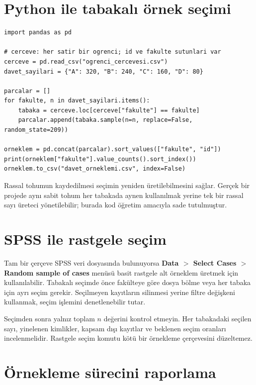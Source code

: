 \section{Python ile tabakalı örnek seçimi}

\begin{lstlisting}
import pandas as pd

# cerceve: her satir bir ogrenci; id ve fakulte sutunlari var
cerceve = pd.read_csv("ogrenci_cercevesi.csv")
davet_sayilari = {"A": 320, "B": 240, "C": 160, "D": 80}

parcalar = []
for fakulte, n in davet_sayilari.items():
    tabaka = cerceve.loc[cerceve["fakulte"] == fakulte]
    parcalar.append(tabaka.sample(n=n, replace=False, random_state=209))

orneklem = pd.concat(parcalar).sort_values(["fakulte", "id"])
print(orneklem["fakulte"].value_counts().sort_index())
orneklem.to_csv("davet_orneklemi.csv", index=False)
\end{lstlisting}

Rassal tohumun kaydedilmesi seçimin yeniden üretilebilmesini sağlar. Gerçek
bir projede aynı sabit tohum her tabakada aynen kullanılmak yerine tek bir
rassal sayı üreteci yönetilebilir; burada kod öğretim amacıyla sade
tutulmuştur.

\section{SPSS ile rastgele seçim}

Tam bir çerçeve SPSS veri dosyasında bulunuyorsa \textbf{Data $>$ Select Cases
$>$ Random sample of cases} menüsü basit rastgele alt örneklem üretmek için
kullanılabilir. Tabakalı seçimde önce fakülteye göre dosya bölme veya her
tabaka için ayrı seçim gerekir. Seçilmeyen kayıtların silinmesi yerine filtre
değişkeni kullanmak, seçim işlemini denetlenebilir tutar.

\begin{outputguidebox}
Seçimden sonra yalnız toplam $n$ değerini kontrol etmeyin. Her tabakadaki
seçilen sayı, yinelenen kimlikler, kapsam dışı kayıtlar ve beklenen seçim
oranları incelenmelidir. Rastgele seçim komutu kötü bir örnekleme çerçevesini
düzeltemez.
\end{outputguidebox}

\section{Örnekleme sürecini raporlama}

